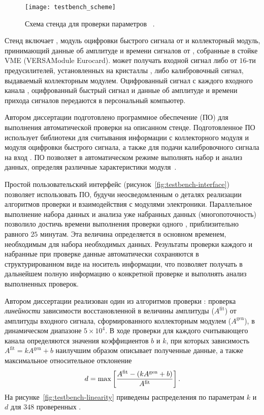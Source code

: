 \begin{figure}[H]
 \centering
  \texttt{[image: testbench\_scheme]}
  \caption{Схема стенда для проверки параметров \sdsp~\cite{testbench}.}
\label{fig:testbench}
\end{figure}

Стенд включает \sdsp, модуль оцифровки быстрого сигнала от \sdsp и коллекторный модуль, принимающий данные об амплитуде и времени сигналов от \sdsp, собранные в стойке VME (VERSAModule Eurocard).  \sdsp может получать входной сигнал либо от $16$-ти предусилителей, установленных на кристаллы \csit, либо калибровочный сигнал, выдаваемый коллекторным модулем.  Оцифрованный сигнал с каждого входного канала \sdsp, оцифрованный быстрый сигнал и данные об амплитуде и времени прихода сигналов передаются в персональный компьютер.

Автором диссертации подготовлено программное обеспечение (ПО) для выполнения автоматической проверки \sdsp на описанном стенде.  Подготовленное ПО использует библиотеки для считывания информации с коллекторного модуля и модуля оцифровки быстрого сигнала, а также для подачи калибровочного сигнала на вход \sdsp.  ПО позволяет в автоматическом режиме выполнять набор и анализ данных, определяя различные характеристики модуля~\cite{testbench}.  

Простой пользовательский интерфейс (рисунок~\ref{fig:testbench-interface}) позволяет использовать ПО, будучи неосведомленным о деталях реализации алгоритмов проверки и взаимодействия с модулями электроники.  Параллельное выполнение набора данных и анализа уже набранных данных (многопоточность) позволило достичь времени выполнения проверки одного \sdsp, приблизительно равного $25$ минутам.  Эта величина определяется в основном временем, необходимым для набора необходимых данных.  Результаты проверки каждого \sdsp и набранные при проверке данные автоматически сохраняются в структурированном виде на носитель информации, что позволяет получать в дальнейшем полную информацию о конкретной проверке и выполнять анализ выполненных проверок.

Автором диссертации реализован один из алгоритмов проверки \sdsp: проверка \emph{линейности} зависимости восстановленной в \sdsp величины амплитуды ($A^{\mathrm{fit}}$) от амплитуды входного сигнала, сформированного коллекторным модулем ($A^{\mathrm{gen}}$), в динамическом диапазоне $5\times10^4$.  В ходе проверки для каждого считывающего канала определяются значения коэффициентов $b$ и $k$, при которых зависимость $A^{\mathrm{fit}} = kA^{\mathrm{gen}} + b$ наилучшим образом описывает полученные данные, а также максимальное относительное отклонение
\begin{equation}
 d = \max\left[\frac{A^{\mathrm{fit}} - \left( kA^{\mathrm{gen}} + b \right)}{A^{\mathrm{fit}}}\right].
\end{equation}
На рисунке~\ref{fig:testbench-linearity} приведены распределения по параметрам $k$ и $d$ для $348$ проверенных \sdsp.

